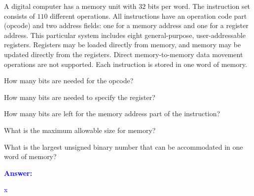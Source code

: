 \item{}
A digital computer has a memory unit with $32$ bits per word. The instruction
set consists of $110$ different operations. All instructions have an operation
code part (opcode) and two address fields: one for a memory address and one
for a register address. This particular system includes eight general-purpose,
user-addressable registers. Registers may be loaded directly from memory, and
memory may be updated directly from the registers. Direct memory-to-memory data
movement operations are not supported. Each instruction is stored in one word
of memory.
\begin{list}{\textbf{}}{}
    \item How many bits are needed for the opcode?\\[12pt]
    \item How many bits are needed to specify the register?\\[12pt]
    \item How many bits are left for the memory address part of the instruction?\\[12pt]
    \item What is the maximum allowable size for memory?\\[12pt]
    \item What is the largest unsigned binary number that can be accommodated in one word of memory?\\[12pt]
\end{list}
\vskip12pt
\ifanswers
\textcolor{blue}{
\textbf{Answer:}\\
\begin{list}{\textbf{}}{}
\item x
\end{list}
}
\newpage
\fi

